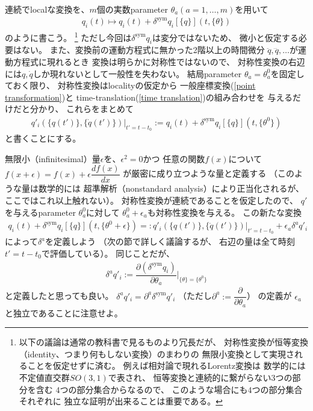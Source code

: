 連続でlocalな変換を、$m$個の実数parameter
$\theta_a (a=1,\dots,m)$を用いて
\begin{align}
  q_i(t) \mapsto q_i(t) +
  \delta^{\mathrm{sym}} q_i[\{ q \}] (t, \{\theta\})
\end{align}
のように書こう。
\footnote{
  以下の議論は通常の教科書で見るものより冗長だが、
  対称性変換が恒等変換
  （identity、つまり何もしない変換）のまわりの
  無限小変換として実現されることを仮定せずに済む。
  例えば相対論で現れるLorentz変換は
  数学的には不定値直交群$SO(3,1)$で表され、
  恒等変換と連続的に繋がらない$3$つの部分を含む
  $4$つの部分集合からなるので、
  このような場合にも$4$つの部分集合それぞれに
  独立な証明が出来ることは重要である。
}
ただし今回は$\delta^{\mathrm{sym}} q_i$は変分ではないため、
微小と仮定する必要はない。
また、変換前の運動方程式に無かった2階以上の時間微分
$\ddot{q}, \dddot{q},\dots$が運動方程式に現れるとき
変換は明らかに対称性ではないので、
対称性変換の右辺には$q, \dot{q}$しか現れないとして一般性を失わない。
結局parameter $\theta_a = \theta_a^0$を固定しておく限り、
対称性変換はlocalityの仮定から
一般座標変換(\ref{point transformation})と
time-translation(\ref{time translation})の組み合わせを
与えるだけだと分かり、
これらをまとめて
\begin{align}
  q'_i( \{ q(t') \}, \{ \dot{q}(t') \} )
    \Big|_{t' = t - t_0}
  := q_i(t) +
  \delta^{\mathrm{sym}} q_i[\{ q \}] (t, \{\theta^0\})
\end{align}
と書くことにする。

無限小（infinitesimal）量$\epsilon$を、$\epsilon^2 = 0$かつ
任意の関数$f(x)$について
$f(x+\epsilon)=f(x) + \epsilon \dfrac{df(x)}{dx}$
が厳密に成り立つような量と定義する
（このような量は数学的には
超準解析（nonstandard analysis）により正当化されるが、
ここではこれ以上触れない）。
対称性変換が連続であることを仮定したので、
$q'$を与えるparameter $\theta_a^0$に対して
$\theta_a^0 + \epsilon_a$も対称性変換を与える。
この新たな変換
\begin{align}
  q_i(t) +
  \delta^{\mathrm{sym}} q_i[\{ q \}] (t, \{\theta^0 + \epsilon\})
  =:
  q'_i( \{ q(t') \}, \{ \dot{q}(t') \} )
    \Big|_{t' = t - t_0}
  + \epsilon_a \delta^a q'_i
\end{align}
によって$\delta^a$を定義しよう
（次の節で詳しく議論するが、
右辺の量は全て時刻$t' = t - t_0$で評価している）。
同じことだが、
\begin{align}
  \delta^a q'_i :=
  \dfrac{\partial
    (\delta^{\mathrm{sym}} q_i)
  }{
    \partial \theta_a
  }
  \Bigg|_{\{\theta\} = \{\theta^0\}}
\end{align}
と定義したと思っても良い。
$\delta^a q'_i
= \partial^a \delta^{\mathrm{sym}} q'_i$
（ただし$\partial^a := \dfrac{\partial}{\partial \theta_a}$）
の定義が
$\epsilon_a$と独立であることに注意せよ。

